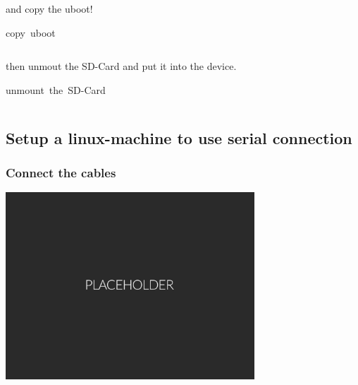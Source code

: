 \documentclass[11pt, a4paper,ngerman]{article}
\begin{document}
and copy the uboot! \\

\begin{mintedbox}[breakable=true,
 bottomrule=0.5mm,
 width=\paperwidth-3cm,
 boxsep=1mm, 
 enhanced=true,
 colframe = monoblack,
 drop fuzzy shadow,
 colback = black
 ]{copy\ uboot}%
 

     \inputminted[firstline=37,lastline=38, 
     linenos=true, framesep=2mm, mathescape, numbersep=5pt,tabsize=4,%
]{bash}{includes/archlinux.sh}%

\end{mintedbox}%
\vspace{0.4cm}

then unmout the SD-Card and put it into the device. \\

\begin{mintedbox}[breakable=true,
 bottomrule=0.5mm,
 width=\paperwidth-3cm,
 boxsep=1mm, 
 enhanced=true,
 colframe = monoblack,
 drop fuzzy shadow,
 colback = black
 ]{unmount\ the\ SD-Card}%
 

     \inputminted[firstline=44,lastline=44, 
     linenos=true, framesep=2mm, mathescape, numbersep=5pt,tabsize=4,%
]{bash}{includes/archlinux.sh}%

\end{mintedbox}%
\vspace{-0.4cm}

\subsection{Setup a linux-machine to use serial connection}

\subsubsection{Connect the cables}

\vspace{0.4cm}
\begin{center}
\includegraphics[width=0.7\textwidth]{pictures/placeholder.png}
\end{center}
\end{document}
